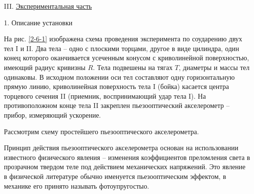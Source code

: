 \documentclass[specialist, subf, href, colorlinks=true, 14pt, final]{disser}
\theoremstyle{definition}
\newcommand{\npart}[2]{\noindent #1. \underline{#2}}
\begin{document}
\npart{III}{Экспериментальная часть}

1. Описание установки

На рис. \ref{2-6-1} изображена схема проведения эксперимента по соударению двух тел I и II. Два тела -- одно с плоскими торцами, другое в виде цилиндра, один конец которого оканчивается усеченным конусом с криволинейной поверхностью, имеющий радиус кривизны $R$. Тела подвешены на тягах $T$, диаметры и массы тел одинаковы. В исходном положении оси тел составляют одну горизонтальную прямую линию, криволинейная поверхность тела I (бойка) касается центра торцевого сечения II (приемник, воспринимающий удар тела I). На противоположном конце тела II закреплен пьезооптический акселерометр -- прибор, измеряющий ускорение.

Рассмотрим схему простейшего пьезооптического акселерометра.
\begin{figure}[!htp]
  \caption{}
  \label{2-6-2}
\end{figure}

Принцип действия пьезооптического акселерометра основан на использовании известного физического явления -- изменения коэффициентов преломления света в прозрачном твердом теле под действием механических напряжений. Это явление в физической литературе обычно именуется пьезооптическим эффектом, в механике его принято называть фотоупругостыо.
\end{document}
